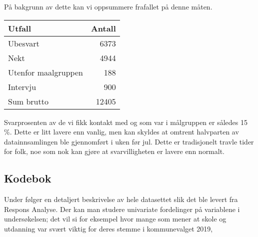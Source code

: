 \documentclass[
]{article}
\begin{document}
På bakgrunn av dette kan vi oppsummere frafallet på denne måten.

\captionsetup[table]{labelformat=empty,skip=1pt}
\begin{longtable}{lr}
\toprule
Utfall & Antall \\ 
\midrule
Ubesvart & 6373 \\ 
Nekt & 4944 \\ 
Utenfor maalgruppen & 188 \\ 
Intervju & 900 \\ 
Sum brutto & 12405 \\ 
\bottomrule
\end{longtable}

Svarprosenten av de vi fikk kontakt med og som var i målgruppen er
således 15 \%. Dette er litt lavere enn vanlig, men kan skyldes at
omtrent halvparten av datainnsamlingen ble gjennomført i uken før jul.
Dette er tradisjonelt travle tider for folk, noe som nok kan gjøre at
svarvilligheten er lavere enn normalt.

\hypertarget{kodebok}{%
\subsection{Kodebok}\label{kodebok}}

Under følger en detaljert beskrivelse av hele datasettet slik det ble
levert fra Respons Analyse. Der kan man studere univariate fordelinger
på variablene i undersøkelsen; det vil si for eksempel hvor mange som
mener at skole og utdanning var svært viktig for deres stemme i
kommunevalget 2019,
\end{document}
